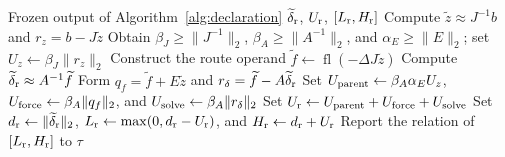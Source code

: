 \begin{algorithm}[H]
\caption{Response-equation finite-precision error enclosure}
\label{alg:response}
\begin{algorithmic}[1]
\Require Frozen output of Algorithm~\ref{alg:declaration}
\Ensure $\widetilde\delta_{\rm r}$, $U_{\rm r}$, $[L_{\rm r},H_{\rm r}]$
\State Compute $\widetilde z\approx J^{-1}b$ and
$r_z=b-J\widetilde z$
\State Obtain $\beta_J\geq\lVert J^{-1}\rVert_2$,
$\beta_A\geq\lVert A^{-1}\rVert_2$, and
$\alpha_E\geq\lVert E\rVert_2$; set
$U_z\gets\beta_J\lVert r_z\rVert_2$
\State Construct the route operand
$\widetilde f\gets\operatorname{fl}(-\Delta J\widetilde z)$
\State Compute $\widetilde\delta_{\rm r}\approx A^{-1}\widetilde f$
\State Form $q_f=\widetilde f+E\widetilde z$ and
$r_\delta=\widetilde f-A\widetilde\delta_{\rm r}$
\State Set
$U_{\rm parent}\gets\beta_A\alpha_EU_z$,
$U_{\rm force}\gets\beta_A\lVert q_f\rVert_2$, and
$U_{\rm solve}\gets\beta_A\lVert r_\delta\rVert_2$
\State Set
$U_{\rm r}\gets U_{\rm parent}+U_{\rm force}+U_{\rm solve}$
\State Set $d_{\rm r}\gets\lVert\widetilde\delta_{\rm r}\rVert_2$,
$L_{\rm r}\gets\max(0,d_{\rm r}-U_{\rm r})$, and
$H_{\rm r}\gets d_{\rm r}+U_{\rm r}$
\State Report the relation of $[L_{\rm r},H_{\rm r}]$ to $\tau$
\end{algorithmic}
\end{algorithm}
